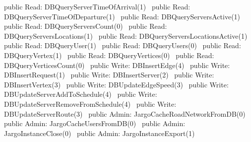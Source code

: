 public \LA{}Read: DBQueryServerTimeOfArrival(1)~{\nwtagstyle{}}\RA{}
public \LA{}Read: DBQueryServerTimeOfDeparture(1)~{\nwtagstyle{}}\RA{}
public \LA{}Read: DBQueryServersActive(1)~{\nwtagstyle{}}\RA{}
public \LA{}Read: DBQueryServersCount(0)~{\nwtagstyle{}}\RA{}
public \LA{}Read: DBQueryServersLocations(1)~{\nwtagstyle{}}\RA{}
public \LA{}Read: DBQueryServersLocationsActive(1)~{\nwtagstyle{}}\RA{}
public \LA{}Read: DBQueryUser(1)~{\nwtagstyle{}}\RA{}
public \LA{}Read: DBQueryUsers(0)~{\nwtagstyle{}}\RA{}
public \LA{}Read: DBQueryVertex(1)~{\nwtagstyle{}}\RA{}
public \LA{}Read: DBQueryVertices(0)~{\nwtagstyle{}}\RA{}
public \LA{}Read: DBQueryVerticesCount(0)~{\nwtagstyle{}}\RA{}
\nwendcode{}\nwdocspar
{}
\nwenddocs{}\plusendmoddef
public \LA{}Write: DBInsertEdge(4)~{\nwtagstyle{}}\RA{}
public \LA{}Write: DBInsertRequest(1)~{\nwtagstyle{}}\RA{}
public \LA{}Write: DBInsertServer(2)~{\nwtagstyle{}}\RA{}
public \LA{}Write: DBInsertVertex(3)~{\nwtagstyle{}}\RA{}
public \LA{}Write: DBUpdateEdgeSpeed(3)~{\nwtagstyle{}}\RA{}
public \LA{}Write: DBUpdateServerAddToSchedule(4)~{\nwtagstyle{}}\RA{}
public \LA{}Write: DBUpdateServerRemoveFromSchedule(4)~{\nwtagstyle{}}\RA{}
public \LA{}Write: DBUpdateServerRoute(3)~{\nwtagstyle{}}\RA{}
\nwendcode{}\nwdocspar
{}
\nwenddocs{}\plusendmoddef
public \LA{}Admin: JargoCacheRoadNetworkFromDB(0)~{\nwtagstyle{}}\RA{}
public \LA{}Admin: JargoCacheUsersFromDB(0)~{\nwtagstyle{}}\RA{}
public \LA{}Admin: JargoInstanceClose(0)~{\nwtagstyle{}}\RA{}
public \LA{}Admin: JargoInstanceExport(1)~{\nwtagstyle{}}\RA{}
